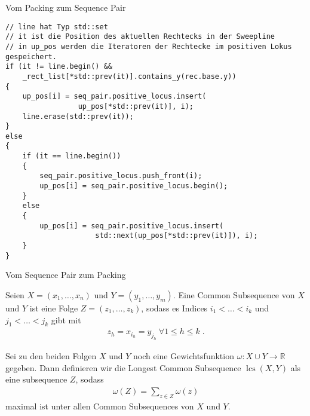 \documentclass{beamer}
\DeclareMathOperator{\lcs}{lcs}
\begin{document}
\begin{frame}{Vom Packing zum Sequence Pair}
\begin{figure}
\begin{tikzpicture}[x=5mm,y=5mm]
  
  \end{tikzpicture}
\end{figure}

\end{frame}

\begin{frame}[fragile]
 \begin{lstlisting}[basicstyle=\scriptsize]
// line hat Typ std::set
// it ist die Position des aktuellen Rechtecks in der Sweepline
// in up_pos werden die Iteratoren der Rechtecke im positiven Lokus gespeichert.
if (it != line.begin() && 
    _rect_list[*std::prev(it)].contains_y(rec.base.y))
{
    up_pos[i] = seq_pair.positive_locus.insert(
                 up_pos[*std::prev(it)], i);
    line.erase(std::prev(it));
}
else
{
    if (it == line.begin())
    {
        seq_pair.positive_locus.push_front(i);
        up_pos[i] = seq_pair.positive_locus.begin();
    }
    else
    {
        up_pos[i] = seq_pair.positive_locus.insert(
                     std::next(up_pos[*std::prev(it)]), i);
    }
}
 \end{lstlisting}
\end{frame}


\begin{frame}{Vom Sequence Pair zum Packing}
\begin{definition}
 Seien $X= (x_1,\dots,x_n)$ und $Y=(y_1,\dots, y_m)$. Eine Common Subsequence von $X$ und $Y$ ist eine Folge $Z=(z_1,\dots, z_k)$, sodass es Indices $i_1<\dots< i_k$ und $j_1 <\dots < j_k$ gibt mit
 \begin{align*}
  z_h = x_{i_h} = y_{j_h} ~\forall 1\leq h\leq k\;.
 \end{align*}
\end{definition}
\begin{definition}
 Sei zu den beiden Folgen $X$ und $Y$ noch eine Gewichtsfunktion $\omega: X\cup Y \to \mathbb{R}$ gegeben. Dann definieren wir die Longest Common Subsequence $\lcs(X,Y)$ als eine subsequence $Z$, sodass 
 \begin{align*}
  \omega(Z) = \sum_{z\in Z} \omega(z)
 \end{align*}
 maximal ist unter allen Common Subsequences von $X$ und $Y$.
\end{definition}
\end{frame}
\end{document}
